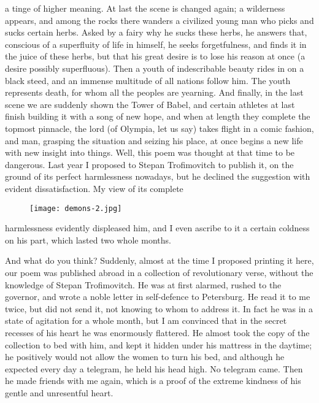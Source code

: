 \documentclass[12pt]{article}
\begin{document}
a tinge of higher meaning. At last the scene is changed again; a
wilderness appears, and among the rocks there wanders a civilized young
man who picks and sucks certain herbs. Asked by a fairy why he sucks
these herbs, he answers that, conscious of a superfluity of life in
himself, he seeks forgetfulness, and finds it in the juice of these
herbs, but that his great desire is to lose his reason at once (a desire
possibly superfluous). Then a youth of indescribable beauty rides in on
a black steed, and an immense multitude of all nations follow him.
The youth represents death, for whom all the peoples are yearning. And
finally, in the last scene we are suddenly shown the Tower of Babel, and
certain athletes at last finish building it with a song of new hope, and
when at length they complete the topmost pinnacle, the lord (of Olympia,
let us say) takes flight in a comic fashion, and man, grasping the
situation and seizing his place, at once begins a new life with new
insight into things. Well, this poem was thought at that time to be
dangerous. Last year I proposed to Stepan Trofimovitch to publish it,
on the ground of its perfect harmlessness nowadays, but he declined
the suggestion with evident dissatisfaction. My view of its complete
\begin{figure}[!ht]
\begin{center}
\texttt{[image: demons-2.jpg]}
\end{center}
\end{figure}
harmlessness evidently displeased him, and I even ascribe to it a
certain coldness on his part, which lasted two whole months.


\vspace{12pt}
And what do you think? Suddenly, almost at the time I proposed printing
it here, our poem was published abroad in a collection of revolutionary
verse, without the knowledge of Stepan Trofimovitch. He was at
first alarmed, rushed to the governor, and wrote a noble letter in
self-defence to Petersburg. He read it to me twice, but did not send
it, not knowing to whom to address it. In fact he was in a state of
agitation for a whole month, but I am convinced that in the secret
recesses of his heart he was enormously flattered. He almost took the
copy of the collection to bed with him, and kept it hidden under his
mattress in the daytime; he positively would not allow the women to turn
his bed, and although he expected every day a telegram, he held his head
high. No telegram came. Then he made friends with me again, which is a
proof of the extreme kindness of his gentle and unresentful heart.
\end{document}
